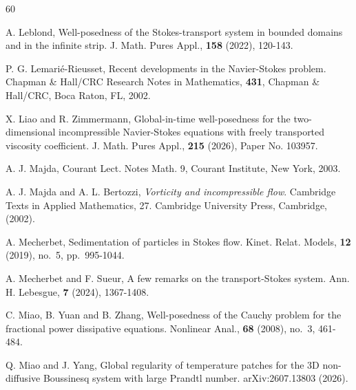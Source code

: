 \documentclass[reqno,11pt,a4paper]{amsart}
\begin{document}
\begin{thebibliography}{60}

A. Leblond, Well-posedness of the Stokes-transport system in bounded domains and in the infinite strip. 
J. Math. Pures Appl., \textbf{158} (2022), 120-143.

P. G. Lemari\'e-Rieusset,
Recent developments in the Navier-Stokes problem.
Chapman \& Hall/CRC Research Notes in Mathematics,
\textbf{431}, Chapman \& Hall/CRC, Boca Raton, FL, 2002.

X. Liao and R. Zimmermann, 
Global-in-time well-posedness for the two-dimensional incompressible Navier-Stokes equations with freely transported viscosity coefficient. 
J. Math. Pures Appl., \textbf{215} (2026), Paper No. 103957.

A. J. Majda,
 Courant Lect.
Notes Math. 9, Courant Institute, New York, 2003.

A. J. Majda and A. L. Bertozzi, 
\emph{Vorticity and incompressible flow}. 
Cambridge Texts in Applied Mathematics, 27. Cambridge University Press, Cambridge, (2002).


A. Mecherbet,
Sedimentation of particles in Stokes flow.
Kinet. Relat. Models, \textbf{12} (2019), no.~5, pp.~995-1044.

A. Mecherbet and F. Sueur,
A few remarks on the transport-Stokes system.
Ann. H. Lebesgue,
\textbf{7} (2024), 1367-1408.


C. Miao, B. Yuan and B. Zhang,
Well-posedness of the Cauchy problem for the fractional
power dissipative equations.
Nonlinear Anal., \textbf{68} (2008), no.~3, 461-484.

Q. Miao and J. Yang, 
Global regularity of temperature patches
for the 3D non-diffusive Boussinesq system
with large Prandtl number.
arXiv:2607.13803 (2026).


\end{thebibliography}
\end{document}
